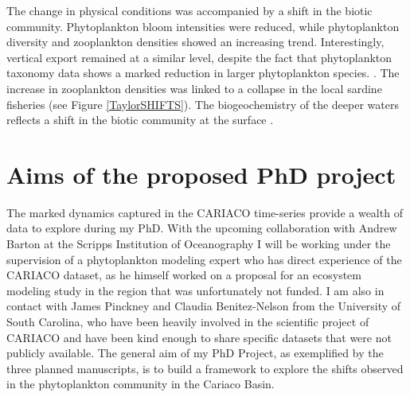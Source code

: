 The change in physical conditions was accompanied by a shift in the biotic community. Phytoplankton bloom intensities were reduced, while phytoplankton diversity and zooplankton densities showed an increasing trend. Interestingly, vertical export remained at a similar level, despite the fact that phytoplankton taxonomy data shows a marked reduction in larger phytoplankton species. \citep{Taylor2012,Pinckney2015}. The increase in zooplankton densities was linked to a collapse in the local sardine fisheries (see Figure \ref{TaylorSHIFTS}). The biogeochemistry of the deeper waters reflects a shift in the biotic community at the surface \citep{Scranton2014}. 

\newpage
\section{Aims of the proposed PhD project}

The marked dynamics captured in the CARIACO time-series provide a wealth of data to explore during my PhD. With the upcoming collaboration with Andrew Barton at the Scripps Institution of Oceanography I will be working under the supervision of a phytoplankton modeling expert who has direct experience of the CARIACO dataset, as he himself worked on a proposal for an ecosystem modeling study in the region that was unfortunately not funded. I am also in contact with James Pinckney and Claudia Benitez-Nelson from the University of South Carolina, who have been heavily involved in the scientific project of CARIACO and have been kind enough to share specific datasets that were not publicly available. The general aim of my PhD Project, as exemplified by the three planned manuscripts, is to build a framework to explore the shifts observed in the phytoplankton community in the Cariaco Basin.


